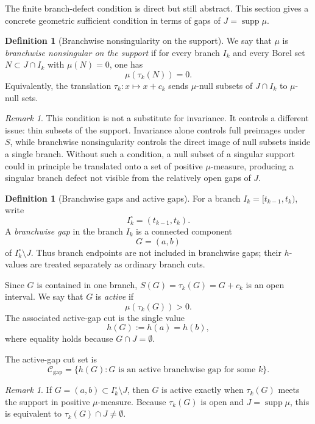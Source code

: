 \documentclass[11pt]{amsart}
\theoremstyle{plain}
\theoremstyle{definition}
\newtheorem{definition}[theorem]{Definition}
\theoremstyle{remark}
\newtheorem{remark}[theorem]{Remark}
\DeclareMathOperator{\supp}{supp}
\newcommand{\cC}{\mathcal C}
\begin{document}
The finite branch-defect condition is direct but still abstract. This section gives a concrete geometric sufficient condition in terms of gaps of $J=\supp\mu$.

\begin{definition}[Branchwise nonsingularity on the support]\label{def:branch-nonsingularity}
We say that $\mu$ is \emph{branchwise nonsingular on the support} if for every branch $I_k$ and every Borel set $N\subset J\cap I_k$ with $\mu(N)=0$, one has
\[
        \mu(\tau_k(N))=0.
\]
Equivalently, the translation $\tau_k:x\mapsto x+c_k$ sends $\mu$-null subsets of $J\cap I_k$ to $\mu$-null sets.
\end{definition}

\begin{remark}
This condition is not a substitute for invariance. It controls a different issue: thin subsets of the support. Invariance alone controls full preimages under $S$, while branchwise nonsingularity controls the direct image of null subsets inside a single branch. Without such a condition, a null subset of a singular support could in principle be translated onto a set of positive $\mu$-measure, producing a singular branch defect not visible from the relatively open gaps of $J$.
\end{remark}


\begin{definition}[Branchwise gaps and active gaps]\label{def:active-gap}
For a branch $I_k=[t_{k-1},t_k)$, write
\[
        I_k^\circ=(t_{k-1},t_k).
\]
A \emph{branchwise gap} in the branch $I_k$ is a connected component
\[
        G=(a,b)
\]
of $I_k^\circ\setminus J$. Thus branch endpoints are not included in branchwise gaps; their $h$-values are treated separately as ordinary branch cuts.

Since $G$ is contained in one branch, $S(G)=\tau_k(G)=G+c_k$ is an open interval. We say that $G$ is \emph{active} if
\[
        \mu(\tau_k(G))>0.
\]
The associated active-gap cut is the single value
\[
        h(G):=h(a)=h(b),
\]
where equality holds because $G\cap J=\emptyset$.

The active-gap cut set is
\[
        \cC_{\mathrm{gap}}
        =\{h(G):G\text{ is an active branchwise gap for some }k\}.
\]
\end{definition}

\begin{remark}
If $G=(a,b)\subset I_k^\circ\setminus J$, then $G$ is active exactly when $\tau_k(G)$ meets the support in positive $\mu$-measure. Because $\tau_k(G)$ is open and $J=\supp\mu$, this is equivalent to $\tau_k(G)\cap J\neq\emptyset$.
\end{remark}
\end{document}
